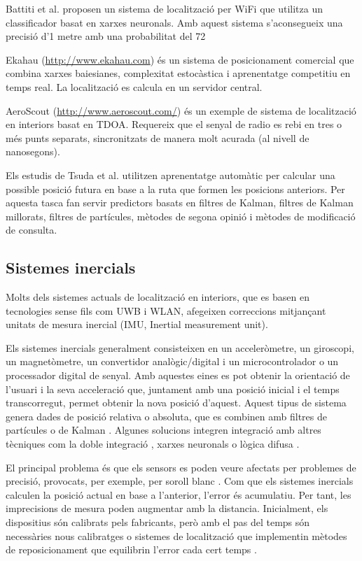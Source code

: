 Battiti et al. \cite{battiti} proposen un sistema de localització per WiFi que utilitza un classificador basat en xarxes neuronals. Amb aquest sistema s'aconsegueix una precisió d'1 metre amb una probabilitat del 72%

Ekahau (\url{http://www.ekahau.com}) és un sistema de posicionament comercial que combina xarxes baiesianes, complexitat estocàstica i aprenentatge competitiu en temps real. La localització es calcula en un servidor central.

AeroScout (\url{http://www.aeroscout.com/}) és un exemple de sistema de localització en interiors basat en TDOA. Requereix que el senyal de radio es rebi en tres o més punts separats, sincronitzats de manera molt acurada (al nivell de nanosegons).

Els estudis de Tsuda et al. \cite{tsuda} utilitzen aprenentatge automàtic per calcular una possible posició futura en base a la ruta que formen les posicions anteriors. Per aquesta tasca fan servir predictors basats en filtres de Kalman, filtres de Kalman millorats, filtres de partícules, mètodes de segona opinió i mètodes de modificació de consulta.


\subsection{Sistemes inercials}

Molts dels sistemes actuals de localització en interiors, que es basen en tecnologies sense fils com UWB i WLAN, afegeixen correccions mitjançant unitats de mesura inercial (IMU, Inertial measurement unit).

Els sistemes inercials generalment consisteixen en un acceleròmetre, un giroscopi, un magnetòmetre, un convertidor analògic/digital i un microcontrolador o un processador digital de senyal. Amb aquestes eines es pot obtenir la orientació de l’usuari i la seva acceleració que, juntament amb una posició inicial i el temps transcorregut, permet obtenir la nova posició d’aquest. Aquest tipus de sistema genera dades de posició relativa o absoluta, que es combinen amb filtres de partícules o de Kalman \cite{vilaseca}. Algunes solucions integren integració amb altres tècniques com la doble integració \cite{negard}, xarxes neuronals \cite{beauregard} o lògica difusa \cite{tome} \cite{garcia}.

El principal problema és que els sensors es poden veure afectats per problemes de precisió, provocats, per exemple, per soroll blanc \cite{vilaseca}. Com que els sistemes inercials calculen la posició actual en base a l'anterior, l’error és acumulatiu. Per tant, les imprecisions de mesura poden augmentar amb la distancia. Inicialment, els dispositius són calibrats pels fabricants, però amb el pas del temps són necessàries nous calibratges o sistemes de localització que implementin mètodes de reposicionament que equilibrin l'error cada cert temps \cite{glancer}.

